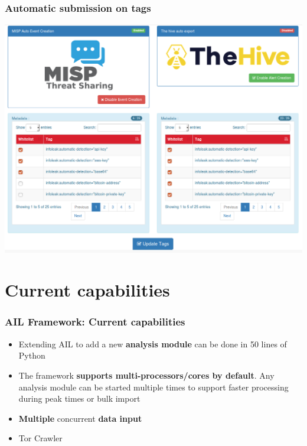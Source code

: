 \documentclass{beamer}
\begin{document}
\begin{frame}
    \frametitle{Automatic submission on tags}
    \centerline{\includegraphics[scale=0.25]{screenshot/tag_auto_export.png}}
\end{frame}


\section{Current capabilities}

\begin{frame}
    \frametitle{AIL Framework: Current capabilities}
    \begin{itemize}
        \item Extending AIL to add a new {\bf analysis module} can be done in 50 lines of Python
        \item The framework {\bf supports multi-processors/cores by default}. Any analysis module can be started multiple times to support faster processing during peak times or bulk import
        \item \textbf{Multiple} concurrent \textbf{data input}
        \item Tor Crawler
    \end{itemize}
\end{frame}
\end{document}
